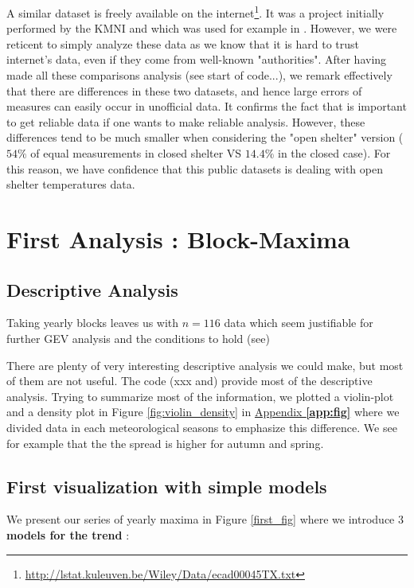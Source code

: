 A similar dataset is freely available on the internet\footnote{\url{http://lstat.kuleuven.be/Wiley/Data/ecad00045TX.txt}}. It was a project initially performed by the KMNI and which was used for example in \citet{beirlant_statistics_2006}. However, we were reticent to simply analyze these data as we know that it is hard to trust internet's data, even if they come from well-known "authorities". After having made all these comparisons analysis (see start of code...), we remark effectively that there are differences
in these two datasets, and hence large errors of measures can easily occur 
in unofficial data. It confirms the fact that is important to get reliable data if one wants to make reliable analysis. 
However, these differences tend to be much smaller when considering the "open shelter"
version ($54\%$ of equal measurements in closed shelter VS $14.4\%$ in the closed case). For this reason, we have confidence that this public datasets
is dealing with open shelter temperatures data.






\section{First Analysis : Block-Maxima}\label{sec:firstana}


\subsection{Descriptive Analysis}

Taking yearly blocks leaves us with $n=116$ data which seem justifiable for further GEV analysis and the conditions to hold (see)

There are plenty of very interesting descriptive analysis we could make, but most of them are not useful. The code (xxx and) provide most of the descriptive analysis. Trying to summarize most of the information, we plotted a violin-plot and a density plot in Figure \ref{fig:violin_density} in \hyperref[app:fig]{Appendix \textbf{\ref{app:fig}}} where we divided data in each meteorological seasons to emphasize this difference. We see for example that the the spread is higher for autumn and spring.

\subsection{First visualization with simple models}

We present our series of yearly maxima in Figure \ref{first_fig} where we introduce 3 \textbf{models for the trend} :


